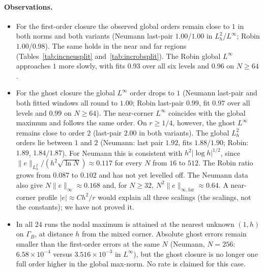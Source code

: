 \documentclass[11pt,a4paper]{article}
\theoremstyle{palplain}
\theoremstyle{paldef}
\theoremstyle{palremark}
\newcommand{\GB}{\Gamma_B}
\begin{document}
\paragraph{Observations.}
\begin{itemize}[leftmargin=1.5em]
\item For the first-order closure the observed global orders remain close to $1$ in both
norms and both variants (Neumann last-pair $1.00$/$1.00$ in $L^2_h$/$L^\infty$; Robin
$1.00$/$0.98$). The same holds in the near and far regions (Tables~\ref{tab:incneusplit} and~\ref{tab:incrobsplit}). The Robin global $L^\infty$
approaches $1$ more slowly, with fits $0.93$ over all six levels and $0.96$ on $N\ge 64$.
\item For the ghost closure the global $L^\infty$ order drops to $1$ (Neumann last-pair
and both fitted windows all round to $1.00$; Robin last-pair $0.99$, fit $0.97$ over all
levels and $0.99$ on $N\ge 64$). The near-corner $L^\infty$ coincides with the global
maximum and follows the same order. On $r\ge 1/4$, however, the ghost $L^\infty$ remains
close to order $2$ (last-pair $2.00$ in both variants). The global $L^2_h$ orders lie between
$1$ and $2$ (Neumann: last pair $1.92$, fits $1.88$/$1.90$; Robin: $1.89$, $1.84$/$1.87$). For
Neumann this is consistent with $h^2|\log h|^{1/2}$, since
$\|e\|_{L^2_h}/(h^2\sqrt{\ln N})\approx0.117$ for every $N$ from $16$ to $512$. The Robin ratio
grows from $0.087$ to $0.102$ and has not yet levelled off. The Neumann data also give
$N\|e\|_\infty\approx0.168$ and, for $N\ge32$, $N^2\|e\|_{\infty,\mathrm{far}}\approx0.64$. A
near-corner profile $|e|\approx Ch^2/r$ would explain all three scalings (the scalings, not the
constants); we have not proved it.
\item In all $24$ runs the nodal maximum is attained at the nearest unknown $(1,h)$ on
$\GB$, at distance $h$ from the mixed corner. Absolute ghost errors remain smaller than
the first-order errors at the same $N$ (Neumann, $N=256$: $6.58\times10^{-4}$ versus
$3.516\times10^{-3}$ in $L^\infty$), but the ghost closure is no longer one full order
higher in the global max-norm. No rate is claimed for this case.
\end{itemize}

\end{document}
